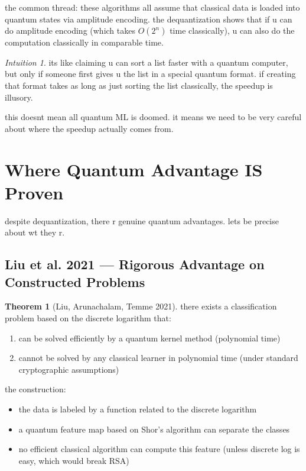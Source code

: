 \documentclass[11pt,a4paper]{article}
\theoremstyle{definition}
\newtheorem{theorem}{Theorem}[section]
\theoremstyle{remark}
\newtheorem*{intuition}{Intuition}
\begin{document}
the common thread: these algorithms all assume that classical data is loaded into quantum states via amplitude encoding. the dequantization shows that if u can do amplitude encoding (which takes $O(2^n)$ time classically), u can also do the computation classically in comparable time.

\begin{intuition}
its like claiming u can sort a list faster with a quantum computer, but only if someone first gives u the list in a special quantum format. if creating that format takes as long as just sorting the list classically, the speedup is illusory.
\end{intuition}

this doesnt mean all quantum ML is doomed. it means we need to be very careful about where the speedup actually comes from.

\section{Where Quantum Advantage IS Proven}

despite dequantization, there r genuine quantum advantages. lets be precise about wt they r.

\subsection{Liu et al. 2021 --- Rigorous Advantage on Constructed Problems}

\begin{theorem}[Liu, Arunachalam, Temme 2021]
there exists a classification problem based on the discrete logarithm that:
\begin{enumerate}[nosep]
    \item can be solved efficiently by a quantum kernel method (polynomial time)
    \item cannot be solved by any classical learner in polynomial time (under standard cryptographic assumptions)
\end{enumerate}
\end{theorem}

the construction:
\begin{itemize}[nosep]
    \item the data is labeled by a function related to the discrete logarithm
    \item a quantum feature map based on Shor's algorithm can separate the classes
    \item no efficient classical algorithm can compute this feature (unless discrete log is easy, which would break RSA)
\end{itemize}
\end{document}
